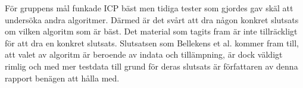 För gruppens mål funkade ICP bäst men tidiga tester som gjordes gav skäl att undersöka andra algoritmer. Därmed är det svårt att dra någon konkret slutsats om vilken algoritm som är bäst. Det material som tagits fram är inte tillräckligt för att dra en konkret slutsats. Slutsatsen som Bellekens et al. \cite{beller2014modern} kommer fram till, att valet av algoritm är beroende av indata och tillämpning, är dock väldigt rimlig och med mer testdata till grund för deras slutsats är författaren av denna rapport benägen att hålla med.



